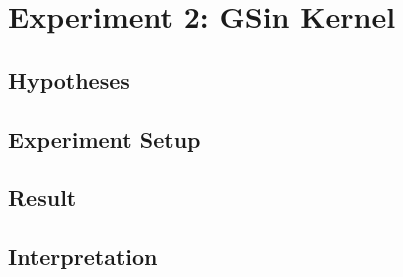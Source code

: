 \documentclass[./\jobname.tex]{subfiles}
\begin{document}
\chapter {Experiment 2: GSin Kernel}
\label{chap:experimet_2}

\section{Hypotheses}

\section{Experiment Setup}

\section{Result}

\section{Interpretation}
\end{document}
